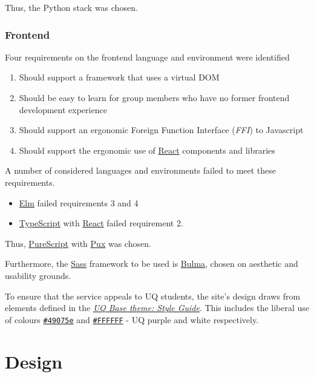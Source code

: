 \documentclass[11pt,a4paper]{report}
\begin{document}
Thus, the Python stack was chosen.

\subsection{Frontend}


Four requirements on the frontend language and environment were identified

\begin{enumerate}
    \item Should support a framework that uses a virtual DOM
    \item Should be easy to learn for group members who have no former frontend development experience
    \item Should support an ergonomic Foreign Function Interface (\textit{FFI}) to Javascript
    \item Should support the ergonomic use of \href{https://facebook.github.io/react/}{React} components and libraries
\end{enumerate}


A number of considered languages and environments failed to meet these requirements.


\begin{itemize}
    \item \href{http://elm-lang.org/}{Elm} failed requirements 3 and 4
    \item \href{https://www.typescriptlang.org/}{TypeScript} with \href{https://facebook.github.io/react/}{React} failed requirement 2.
\end{itemize}

Thus, \href{http://www.purescript.org/}{PureScript} with \href{http://www.purescript-pux.org/}{Pux} was chosen.

Furthermore, the \href{https://sass-lang.com/}{Sass} framework to be used is \href{http://bulma.io/}{Bulma}, chosen on aesthetic and usability grounds.

To ensure that the service appeals to UQ students, the site's design draws from elements defined in the \href{http://drupal.uq.edu.au/guide/uq-base-theme-style-guide}{\textit{UQ Base theme: Style Guide}}. This includes the liberal use of colours \href{http://www.color-hex.com/color/49075e}{\texttt{\#49075e}} and \href{http://www.color-hex.com/color/ffffff}{\texttt{\#FFFFFF}} - UQ purple and white respectively.


\chapter{Design}
\end{document}
